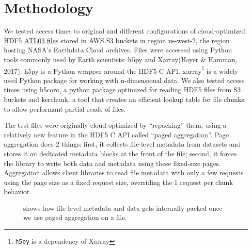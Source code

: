 \documentclass[
]{agujournal2019}
\begin{document}
\section{Methodology}\label{methodology}

We tested access times to original and different configurations of
cloud-optimized HDF5
\href{https://its-live-data.s3.amazonaws.com/index.html\#test-space/cloud-experiments/h5cloud/}{ATL03
files} stored in AWS S3 buckets in region us-west-2, the region hosting
NASA's Earthdata Cloud archives. Files were accessed using Python tools
commonly used by Earth scientists: h5py and Xarray(Hoyer \& Hamman,
2017). h5py is a Python wrapper around the HDF5 C API. xarray\footnote{\texttt{h5py}
  is a dependency of Xarray} is a widely used Python package for working
with n-dimensional data. We also tested access times using h5coro, a
python package optimized for reading HDF5 files from S3 buckets and
kerchunk, a tool that creates an efficient lookup table for file chunks
to allow performant partial reads of files.

The test files were originally cloud optimized by ``repacking'' them,
using a relatively new feature in the HDF5 C API called ``paged
aggregation''. Page aggregation does 2 things: first, it collects
file-level metadata from datasets and stores it on dedicated metadata
blocks at the front of the file; second, it forces the library to write
both data and metadata using these fixed-size pages. Aggregation allows
client libraries to read file metadata with only a few requests using
the page size as a fixed request size, overriding the 1 request per
chunk behavior.

\begin{figure}


\caption{\label{fig-2}shows how file-level metadata and data gets
internally packed once we use paged aggregation on a file.}

\end{figure}%
\end{document}
